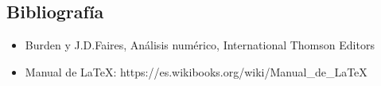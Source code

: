 \subsection{Bibliografía}

\begin{itemize}
\item Burden y J.D.Faires, Análisis numérico, International Thomson Editors
\item Manual de LaTeX: https://es.wikibooks.org/wiki/Manual_de_LaTeX
\end{itemize}